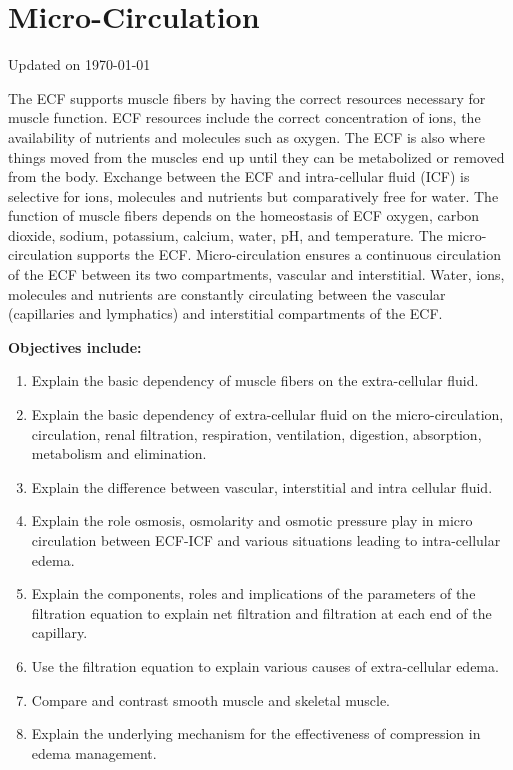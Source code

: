 \chapter{Micro-Circulation}\label{chp:ecf_microcirculation}
Updated on \today
\minitoc

The ECF supports muscle fibers by having the correct resources necessary for muscle function. ECF resources include the correct concentration of ions, the availability of nutrients and molecules such as oxygen. The ECF is also where things moved from the muscles end up until they can be metabolized or removed from the body. Exchange between the ECF and intra-cellular fluid (ICF) is selective for ions, molecules and nutrients but comparatively free for water. The function of muscle fibers depends on the homeostasis of ECF oxygen, carbon dioxide, sodium, potassium, calcium, water, pH, and temperature.
The micro-circulation supports the ECF. Micro-circulation ensures a continuous circulation of the ECF between its two compartments, vascular and interstitial. Water, ions, molecules and nutrients are constantly circulating between the vascular (capillaries and lymphatics) and interstitial compartments of the ECF. 

\vspace{5mm}

\textbf{Objectives include:}
\begin{enumerate}
    \item Explain the basic dependency of muscle fibers on the extra-cellular fluid.
    \item Explain the basic dependency of extra-cellular fluid on the micro-circulation, circulation, renal filtration, respiration, ventilation, digestion, absorption, metabolism and elimination.
    \item Explain the difference between vascular, interstitial and intra cellular fluid.
    \item Explain the role osmosis, osmolarity and osmotic pressure play in micro circulation between ECF-ICF and various situations leading to intra-cellular edema.
    \item Explain the components, roles and implications of the parameters of the filtration equation to explain net filtration and filtration at each end of the capillary.
    \item Use the filtration equation to explain various causes of extra-cellular edema.
    \item Compare and contrast smooth muscle and skeletal muscle.
    \item Explain the underlying mechanism for the effectiveness of compression in edema management.
\end{enumerate}

